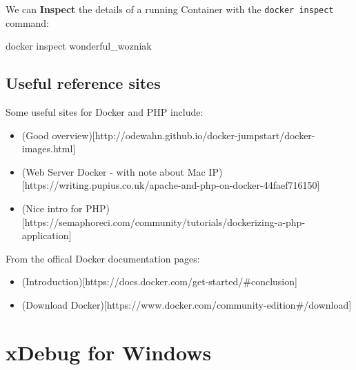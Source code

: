 \documentclass[a4paperpaper,openright]{book}
\newenvironment{Shaded}{}{}
\newcommand{\ExtensionTok}[1]{#1}
\newcommand{\NormalTok}[1]{#1}
\providecommand{\tightlist}{%
  \setlength{\itemsep}{0pt}\setlength{\parskip}{0pt}}
\begin{document}
\begin{Shaded}
\end{Shaded}

We can \textbf{Inspect} the details of a running Container with the
\texttt{docker\ inspect} command:

\begin{Shaded}
\begin{Highlighting}[]
    \ExtensionTok{docker}\NormalTok{ inspect wonderful_wozniak}
\end{Highlighting}
\end{Shaded}

\hypertarget{useful-reference-sites}{%
\section{Useful reference sites}\label{useful-reference-sites}}

Some useful sites for Docker and PHP include:

\begin{itemize}
\item
  (Good
  overview){[}http://odewahn.github.io/docker-jumpstart/docker-images.html{]}
\item
  (Web Server Docker - with note about Mac
  IP){[}https://writing.pupius.co.uk/apache-and-php-on-docker-44faef716150{]}
\item
  (Nice intro for
  PHP){[}https://semaphoreci.com/community/tutorials/dockerizing-a-php-application{]}
\end{itemize}

From the offical Docker documentation pages:

\begin{itemize}
\tightlist
\item
  (Introduction){[}https://docs.docker.com/get-started/\#conclusion{]}
\item
  (Download
  Docker){[}https://www.docker.com/community-edition\#/download{]}
\end{itemize}

\hypertarget{xdebug-for-windows}{%
\chapter{\texorpdfstring{xDebug for Windows
\label{appendix_xdebug}}{xDebug for Windows }}\label{xdebug-for-windows}}
\end{document}
